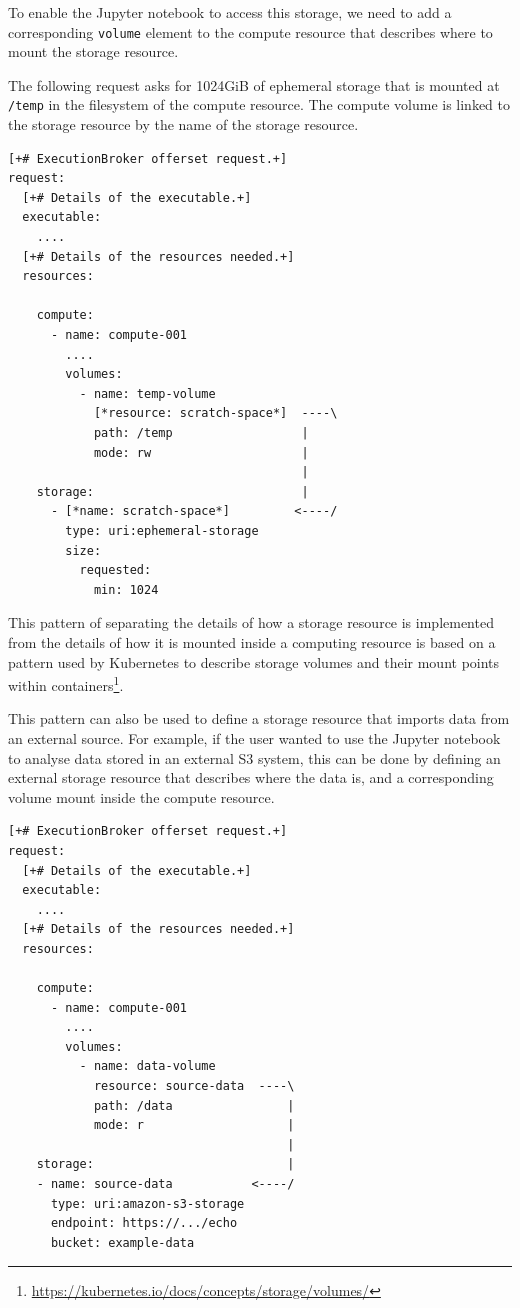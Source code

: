 \documentclass[11pt,a4paper]{ivoa}
\newcommand{\jupyternotebook} {Jupyter notebook}
\newcommand{\kubernetes} {Kubernetes}
\newcommand{\codeword}[1] {\texttt{#1}}
\newcommand{\footurl}[1] {\footnote{\url{#1}}}
\begin{document}
To enable the \jupyternotebook{} to access this storage, we need to add a
corresponding \codeword{volume} element to the compute resource that describes
where to mount the storage resource.

The following request asks for 1024GiB of ephemeral storage
that is mounted at \codeword{/temp} in the filesystem of the compute resource.
The compute volume is linked to the storage resource by the name of the
storage resource.

\begin{lstlisting}[]
[+# ExecutionBroker offerset request.+]
request:
  [+# Details of the executable.+]
  executable:
    ....
  [+# Details of the resources needed.+]
  resources:

    compute:
      - name: compute-001
        ....
        volumes:
          - name: temp-volume
            [*resource: scratch-space*]  ----\
            path: /temp                  |
            mode: rw                     |
                                         |
    storage:                             |
      - [*name: scratch-space*]         <----/
        type: uri:ephemeral-storage
        size:
          requested:
            min: 1024
\end{lstlisting}

This pattern of separating the details of how a storage resource is implemented
from the details of how it is mounted inside a computing resource is based on a
pattern used by \kubernetes{} to describe storage volumes and their mount points
within containers\footurl{https://kubernetes.io/docs/concepts/storage/volumes/}.

This pattern can also be used to define a storage resource that imports data from
an external source.
For example, if the user wanted to use the \jupyternotebook{} to analyse data stored
in an external S3 system, this can be done by defining an external storage resource
that describes where the data is,
and a corresponding volume mount inside the compute resource.

\begin{lstlisting}[]
[+# ExecutionBroker offerset request.+]
request:
  [+# Details of the executable.+]
  executable:
    ....
  [+# Details of the resources needed.+]
  resources:

    compute:
      - name: compute-001
        ....
        volumes:
          - name: data-volume
            resource: source-data  ----\
            path: /data                |
            mode: r                    |
                                       |
    storage:                           |
    - name: source-data           <----/
      type: uri:amazon-s3-storage
      endpoint: https://.../echo
      bucket: example-data
\end{lstlisting}
\end{document}
